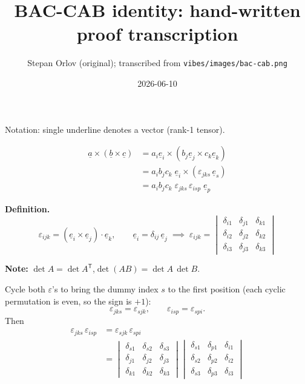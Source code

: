 \documentclass{article}
\title{BAC-CAB identity: hand-written proof transcription}
\date{2026-06-10}
\author{Stepan Orlov (original); transcribed from \texttt{vibes/images/bac-cab.png}}
\newcommand{\vv}[1]{\underline{#1}}
\begin{document}
\maketitle

\noindent
Notation: single underline denotes a vector (rank-1 tensor).

%
%
\begin{align*}
\vv{a} \times (\vv{b} \times \vv{c})
  &= a_i \vv{e}_i \times (b_j \vv{e}_j \times c_k \vv{e}_k) \\
  &= a_i b_j c_k \;\vv{e}_i \times (\varepsilon_{jks}\, \vv{e}_s) \\
  &= a_i b_j c_k \;\varepsilon_{jks}\, \varepsilon_{isp}\; \vv{e}_p
\end{align*}

%
%
\noindent
\textbf{Definition.}
\[
  \varepsilon_{ijk} = (\vv{e}_i \times \vv{e}_j)\cdot \vv{e}_k,
  \qquad
  \vv{e}_i = \delta_{ij}\,\vv{e}_j
  \;\implies\;
  \varepsilon_{ijk}
  = \begin{vmatrix}
      \delta_{i1} & \delta_{j1} & \delta_{k1} \\
      \delta_{i2} & \delta_{j2} & \delta_{k2} \\
      \delta_{i3} & \delta_{j3} & \delta_{k3}
    \end{vmatrix}
\]

%
%
\noindent
\textbf{Note:} $\det A = \det A^{\mathsf{T}}$,\quad $\det(AB) = \det A\,\det B$.

\medskip\noindent
Cycle both $\varepsilon$'s to bring the dummy index $s$ to the first position
(each cyclic permutation is even, so the sign is $+1$):
\[
  \varepsilon_{jks} = \varepsilon_{sjk},
  \qquad
  \varepsilon_{isp} = \varepsilon_{spi}.
\]
Then
\begin{align*}
  \varepsilon_{jks}\,\varepsilon_{isp}
  &= \varepsilon_{sjk}\,\varepsilon_{spi} \\
  &=
  \begin{vmatrix}
    \delta_{s1} & \delta_{s2} & \delta_{s3} \\
    \delta_{j1} & \delta_{j2} & \delta_{j3} \\
    \delta_{k1} & \delta_{k2} & \delta_{k3}
  \end{vmatrix}
  \begin{vmatrix}
    \delta_{s1} & \delta_{p1} & \delta_{i1} \\
    \delta_{s2} & \delta_{p2} & \delta_{i2} \\
    \delta_{s3} & \delta_{p3} & \delta_{i3}
  \end{vmatrix}
\end{align*}
\end{document}
